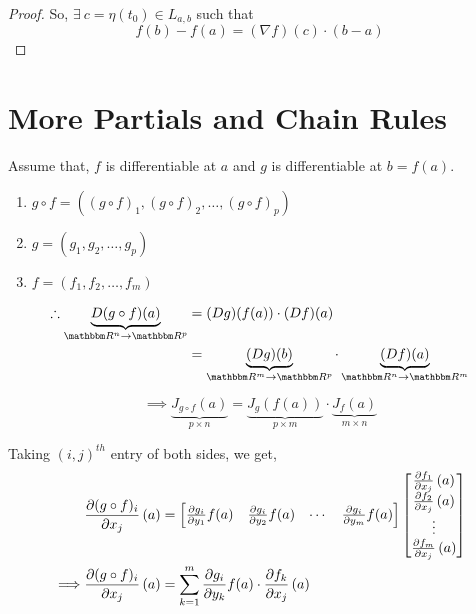 \documentclass[../Analysis-3]{subfiles}
\begin{document}
\begin{proof}
    So, $\exists\ c = \eta(t_0) \in L_{a,b}$ such that \[ f(b) - f(a) = (\nabla f)(c)\cdot(b-a) \]
\end{proof}

\section{More Partials and Chain Rules}

Assume that, $f$ is differentiable at $a$ and $g$ is differentiable at $b = f(a)$.

\begin{notnBox}
    \begin{enumerate}
        \item $g \circ f = \left( (g \circ f)_1 , (g \circ f)_2 , \ldots, (g \circ f)_p \right)$
        \item $g = \left( g_1, g_2, \ldots, g_p \right)$
        \item $f = \left( f_1, f_2, \ldots, f_m \right)$
    \end{enumerate}
\end{notnBox}

\begin{align*}
    \therefore    \underbrace{D(g \circ f)(a)}_{\R^n \to \R^p} & = (Dg)(f(a))\cdot (Df)(a)                                                        \\
                                                               & = \underbrace{(Dg)(b)}_{\R^m \to \R^p}\cdot \underbrace{(Df)(a)}_{\R^n \to \R^m}
\end{align*}

\[\implies \underbrace{J_{g \circ f}(a)}_{p \times n} = \underbrace{J_{g}(f(a))}_{p \times m}\cdot \underbrace{J_{f}(a)}_{m \times n} \]

Taking $(i,j)^{th}$ entry of both sides, we get,
\begin{align*}
             & \pdv{(g\circ f)_{i}}{x_j}\left( a \right) = \begin{bmatrix}
                                                               \pdv{g_i}{y_1}f(a) & \pdv{g_i}{y_2}f(a) & \cdots & \pdv{g_i}{y_m}f(a)
                                                           \end{bmatrix} \begin{bmatrix}
                                                                             \pdv{f_1}{x_j}\left( a \right) \\
                                                                             \pdv{f_2}{x_j}\left( a \right) \\
                                                                             \vdots                         \\
                                                                             \pdv{f_m}{x_j}\left( a \right)
                                                                         \end{bmatrix}  \\
    \implies & \pdv{(g\circ f)_{i}}{x_j}\left( a \right) = \sum_{k = 1}^{m} \pdv{g_i}{y_k}f(a)\cdot\pdv{f_k}{x_j}\left( a \right)
\end{align*}
\end{document}
